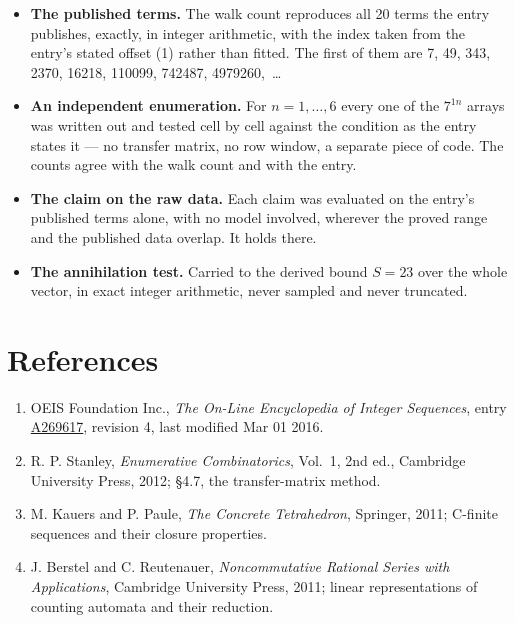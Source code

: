 \documentclass[11pt]{article}
\theoremstyle{definition}
\begin{document}
\begin{itemize}

\item {\bfseries The published terms.} The walk count reproduces all 20 terms the entry publishes, exactly, in integer arithmetic, with the index taken from the entry's stated offset (1) rather than fitted. The first of them are 7, 49, 343, 2370, 16218, 110099, 742487, 4979260,~\dots

\item {\bfseries An independent enumeration.} For $n = 1,\dots,6$ every one of the $7^{1n}$ arrays was written out and tested cell by cell against the condition as the entry states it --- no transfer matrix, no row window, a separate piece of code. The counts agree with the walk count and with the entry.

\item {\bfseries The claim on the raw data.} Each claim was evaluated on the entry's published terms alone, with no model involved, wherever the proved range and the published data overlap. It holds there.

\item {\bfseries The annihilation test.} Carried to the derived bound $S = 23$ over the whole vector, in exact integer arithmetic, never sampled and never truncated.

\end{itemize}

\section{References}

\begin{enumerate}

\item OEIS Foundation Inc., \emph{The On-Line Encyclopedia of Integer Sequences}, entry \href{https://oeis.org/A269617}{A269617}, revision 4, last modified Mar 01 2016.

\item R. P. Stanley, \emph{Enumerative Combinatorics}, Vol.~1, 2nd ed., Cambridge University Press, 2012; \S4.7, the transfer-matrix method.

\item M. Kauers and P. Paule, \emph{The Concrete Tetrahedron}, Springer, 2011; C-finite sequences and their closure properties.

\item J. Berstel and C. Reutenauer, \emph{Noncommutative Rational Series with Applications}, Cambridge University Press, 2011; linear representations of counting automata and their reduction.

\end{enumerate}
\end{document}
